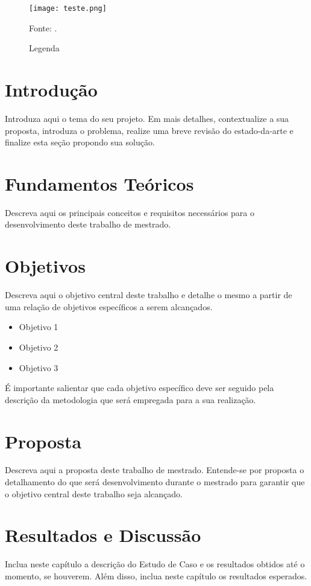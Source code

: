 \documentclass[article,11pt,oneside,a4paper,english,brazil,sumario=tradicional]{abntex2}
\begin{document}
\begin{figure}[H] 
\centering %
\caption{Legenda}
\texttt{[image: teste.png]}

Fonte: \cite{Raichle2011}.
\label{f:ref-cruzada}
\end{figure}

\section{Introdução}
Introduza aqui o tema do seu projeto. Em mais detalhes, contextualize a sua proposta, introduza o problema, realize uma breve revisão do estado-da-arte e finalize esta seção propondo sua solução.



\section{Fundamentos Teóricos}
Descreva aqui os principais conceitos e requisitos necessários para o desenvolvimento deste trabalho de mestrado.

\section{Objetivos}
Descreva aqui o objetivo central deste trabalho e detalhe o mesmo a partir de uma relação de objetivos específicos a serem alcançados.
\begin{itemize}
    \item Objetivo 1
    \item Objetivo 2
    \item Objetivo 3
\end{itemize}

É importante salientar que cada objetivo específico deve ser seguido pela descrição da metodologia que será empregada para a sua realização.


\section{Proposta}
Descreva aqui a proposta deste trabalho de mestrado. Entende-se por proposta o detalhamento do que será desenvolvimento durante o mestrado para garantir que o objetivo central deste trabalho seja alcançado. 

\section{Resultados e Discussão}
Inclua neste capítulo a descrição do Estudo de Caso e os resultados obtidos até o momento, se houverem. Além disso, inclua neste capítulo os resultados esperados. 
\end{document}
